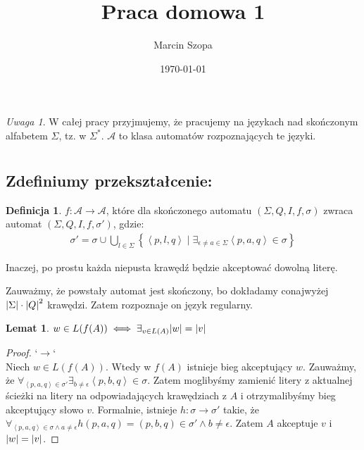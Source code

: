 \documentclass{article}
\title{Praca domowa 1}
\author{Marcin Szopa}
\date{\today}
\newtheorem{lemma}[theorem]{Lemat}
\theoremstyle{definition}
\newtheorem{definition}{Definicja}[section]
\theoremstyle{remark}
\newtheorem*{remark}{Uwaga}
\begin{document}
\maketitle

\begin{remark}
    W całej pracy przyjmujemy, że pracujemy na językach nad skończonym alfabetem \(\Sigma\), tz. w \( \Sigma^* \). \(\mathcal{A}\) to klasa automatów rozpoznających te języki.
\end{remark}

\section{}

\subsection{Zdefiniumy przekształcenie:}

\begin{definition}
    \(f: \mathcal{A} \to \mathcal{A}\), które dla skończonego automatu \(\left(\Sigma, Q, I, f, \sigma\right)\) zwraca automat \(\left(\Sigma, Q, I, f, \sigma'\right)\), gdzie:
    \begin{align*}
        \sigma' = \sigma \cup \bigcup_{l \in \Sigma} \left\{ \left< p, l, q \right> \mid \exists_{\epsilon \neq a \in \Sigma}{\left< p, a, q \right> \in \sigma} \right\}
    \end{align*}
\end{definition}
Inaczej, po prostu każda niepusta krawędź będzie akceptować dowolną literę.

Zauważmy, że powstały automat jest skończony, bo dokładamy conajwyżej
\(\abs{\Sigma} \cdot \abs{Q}^2\) krawędzi. Zatem rozpoznaje on język regularny.

\begin{lemma}
    \(w \in L(f(A)) \iff \exists_{v \in L(A)} \abs{w}=\abs{v}\)
\end{lemma}
\begin{proof}
    `\(\rightarrow\)` \\
    Niech \(w \in L(f(A))\). Wtedy w \(f(A)\) istnieje bieg akceptujący \(w\).
    Zauważmy, że \(\forall_{\left< p, a, q \right> \in \sigma'} \exists_{b \neq \epsilon} \left< p, b, q \right> \in \sigma\).
    Zatem moglibyśmy zamienić litery z aktualnej ścieżki na litery na odpowiadających krawędziach z \(A\)
    i otrzymalibyśmy bieg akceptujący słowo \(v\).
    Formalnie, istnieje \(h: \sigma \to \sigma'\) takie,
    że \( \forall_{\left< p, a, q \right> \in \sigma \land a \neq \epsilon} {h(p, a, q) = (p, b, q) \in \sigma' \land b \neq \epsilon }\).
    Zatem \(A\) akceptuje \(v\) i \(\abs{w} = \abs{v}\).
\end{proof}
\end{document}
